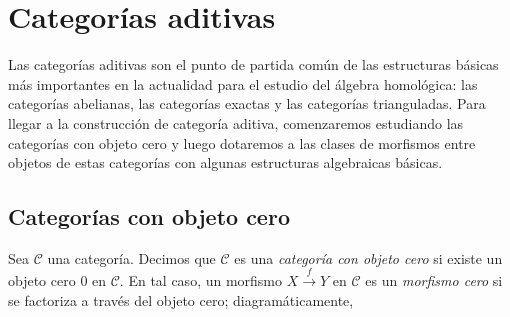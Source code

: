 \documentclass[tesis]{subfiles}
\begin{document}
\chapter{Categorías aditivas}\label{Chap: Categorías aditivas}

Las categorías aditivas son el punto de partida común de las estructuras básicas más importantes en la actualidad para el estudio del álgebra homológica: las categorías abelianas, las categorías exactas y las categorías trianguladas. Para llegar a la construcción de categoría aditiva, comenzaremos estudiando las categorías con objeto cero y luego dotaremos a las clases de morfismos entre objetos de estas categorías con algunas estructuras algebraicas básicas.

\section{Categorías con objeto cero} \label{Mendoza-1.5}

\begin{Def}\label{Def: Categoría con objeto cero}
    Sea $\mathscr{C}$ una categoría. Decimos que $\mathscr{C}$ es una \emph{categoría con objeto cero} si existe un objeto cero $0$ en $\mathscr{C}$. En tal caso, un morfismo $X\xrightarrow{f} Y$ en $\mathscr{C}$ es un \emph{morfismo cero} si se factoriza a través del objeto cero; diagramáticamente,
    \begin{center}
    \end{center}
\end{Def}
\end{document}
